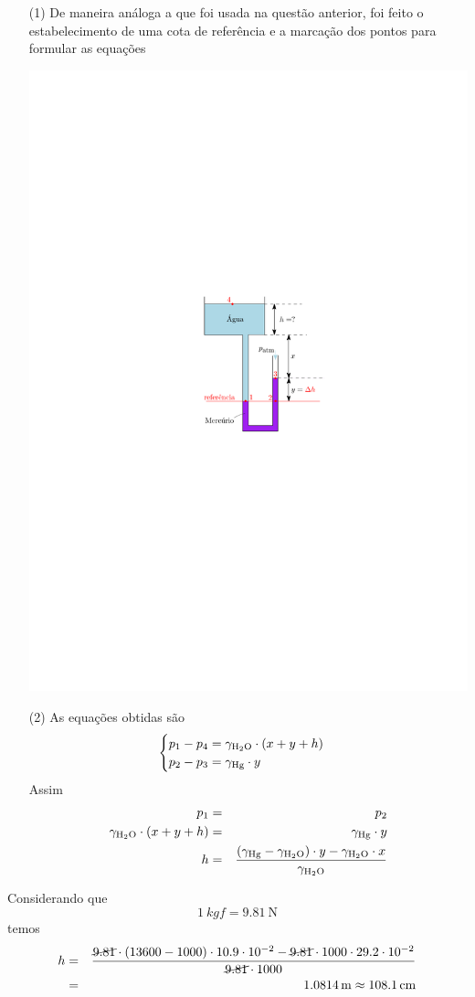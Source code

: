 \documentclass[
	a4paper,
	12pt,
	brazilian
]{article}
\begin{document}
	\begin{enumerate}
		\item[(1)] De maneira análoga a que foi usada na questão anterior, foi feito o estabelecimento de uma cota de referência e a marcação dos pontos para formular as equações
		\begin{center}
			\includegraphics[width=.5\linewidth]{assets/images/referencia_2}
		\end{center}
		\item[(2)] As equações obtidas são
		$$
		\begin{cases}
			p_{1}-p_{4}=\gamma_{\ce{H2O}}\cdot (x+y+h)\\
			p_{2}-p_{3}=\gamma_{\ce{Hg}}\cdot y
		\end{cases}
		$$
		Assim
		\begin{eqnarray}
			p_{1}&=&p_{2}\\
			\gamma_{\ce{H2O}}\cdot (x+y+h)&=&\gamma_{\ce{Hg}}\cdot y\\
			h&=&\dfrac{(\gamma_{\ce{Hg}}-\gamma_{\ce{H2O}})\cdot y-\gamma_{\ce{H2O}}\cdot x}{\gamma_{\ce{H2O}}}
		\end{eqnarray}
	\end{enumerate}
	Considerando que 
	\begin{equation}
		\SI{1}{kgf}=\SI{9.81}{\newton}
	\end{equation}
	temos
	\begin{eqnarray}
		h&=&\dfrac{\cancel{9.81}\cdot (13600-1000)\cdot 10.9\cdot 10^{-2}-\cancel{9.81}\cdot 1000\cdot 29.2\cdot 10^{-2}}{\cancel{9.81}\cdot 1000}\\
		&=&\SI{1.0814}{\meter}\approx\SI{108.1}{\centi\meter}
	\end{eqnarray}
\end{document}

